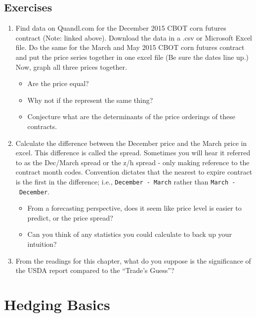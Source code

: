 \documentclass[]{book}
\providecommand{\tightlist}{%
  \setlength{\itemsep}{0pt}\setlength{\parskip}{0pt}}
\theoremstyle{definition}
\theoremstyle{definition}
\theoremstyle{remark}
\begin{document}
\section{Exercises}\label{exercises-1}

\begin{enumerate}
\def\labelenumi{\arabic{enumi}.}
\tightlist
\item
  Find data on Quandl.com for the December 2015 CBOT corn futures
  contract (Note: linked above). Download the data in a .csv or
  Microsoft Excel file. Do the same for the March and May 2015 CBOT corn
  futures contract and put the price series together in one excel file
  (Be sure the dates line up.) Now, graph all three prices together.

  \begin{itemize}
  \tightlist
  \item
    Are the price equal?
  \item
    Why not if the represent the same thing?
  \item
    Conjecture what are the determinants of the price orderings of these
    contracts.
  \end{itemize}
\item
  Calculate the difference between the December price and the March
  price in excel. This difference is called the spread. Sometimes you
  will hear it referred to as the Dec/March spread or the z/h spread -
  only making reference to the contract month codes. Convention dictates
  that the nearest to expire contract is the first in the difference;
  i.e., \texttt{December\ -\ March} rather than
  \texttt{March\ -\ December}.

  \begin{itemize}
  \tightlist
  \item
    From a forecasting perspective, does it seem like price level is
    easier to predict, or the price spread?
  \item
    Can you think of any statistics you could calculate to back up your
    intuition?
  \end{itemize}
\item
  From the readings for this chapter, what do you suppose is the
  significance of the USDA report compared to the ``Trade's Guess''?
\end{enumerate}

\chapter{Hedging Basics}\label{hedging-basics}
\end{document}
